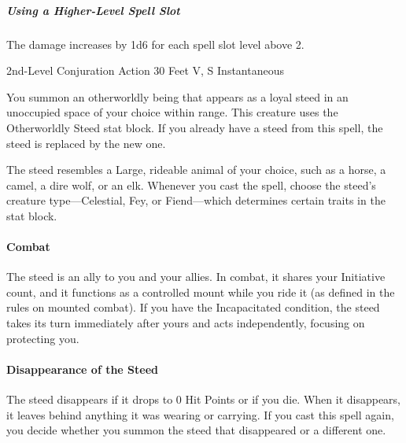\documentclass[letterpaper,openany,oneside,twocolumn]{book}
\begin{document}
\subparagraph*{Using a Higher-Level Spell Slot} The damage increases by 1d6 for each spell slot level above 2.

	{2nd-Level Conjuration}
	{Action}
	{30 Feet}
	{V, S}
	{Instantaneous}

You summon an otherworldly being that appears as a loyal steed in an unoccupied space of your choice within range. This creature uses the Otherworldly Steed stat block. If you already have a steed from this spell, the steed is replaced by the new one.

The steed resembles a Large, rideable animal of your choice, such as a horse, a camel, a dire wolf, or an elk. Whenever you cast the spell, choose the steed's creature type—Celestial, Fey, or Fiend—which determines certain traits in the stat block.

\paragraph*{Combat} The steed is an ally to you and your allies. In combat, it shares your Initiative count, and it functions as a controlled mount while you ride it (as defined in the rules on mounted combat). If you have the Incapacitated condition, the steed takes its turn immediately after yours and acts independently, focusing on protecting you.

\paragraph*{Disappearance of the Steed} The steed disappears if it drops to 0 Hit Points or if you die. When it disappears, it leaves behind anything it was wearing or carrying. If you cast this spell again, you decide whether you summon the steed that disappeared or a different one.
\end{document}
